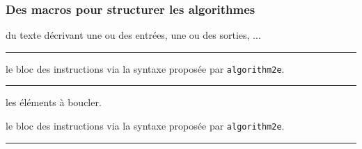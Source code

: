 \documentclass[12pt,a4paper]{article}
\theoremstyle{definition}
\newcommand\separation{
    \medskip
    \hfill\rule{0.5\textwidth}{0.75pt}\hfill
    \medskip
}
\newcommand\extraspace{
    \vspace{0.25em}
}
\begin{document}
\subsubsection{Des macros pour structurer les algorithmes}







\extraspace





\extraspace





\extraspace






\IDarg{} du texte décrivant une ou des entrées, une ou des sorties, ...




\separation





\IDarg{} le bloc des instructions via la syntaxe proposée par \verb#algorithm2e#.




\separation





 les éléments à boucler.

 le bloc des instructions via la syntaxe proposée par \verb#algorithm2e#.




\separation
\end{document}
